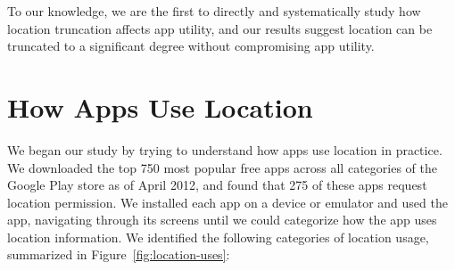 \documentclass[10pt, conference, compsocconf]{IEEEtran}
\newcommand{\numinvestigatedapps}{750\xspace}
\newcommand{\numappsusinglocation}{275\xspace}
\begin{document}
To our knowledge, we are the first to directly and systematically
study how location truncation affects app utility, and our results
suggest location can be truncated to a significant degree without
compromising app utility.

\section{How Apps Use Location}
\label{sec:usage}

We began our study by trying to understand how apps use location in
practice. We downloaded the top \numinvestigatedapps most popular free
apps
across all categories of the Google Play store as of April 2012, and
found that \numappsusinglocation of these apps request location
permission.  We installed each app on a device or emulator and used
the app, navigating through its screens until we could categorize how
the app uses location information. We identified the following
categories of location usage, summarized in Figure~\ref{fig:location-uses}:
\end{document}
